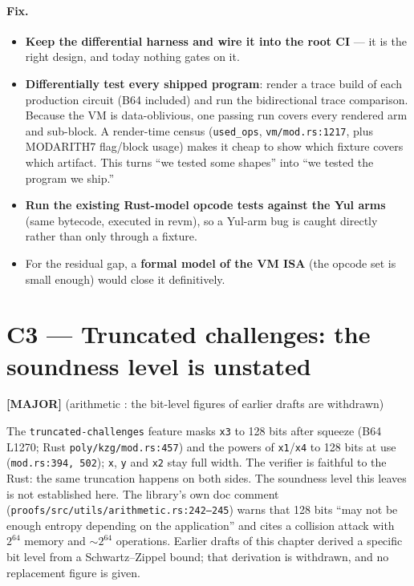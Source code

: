 \paragraph{Fix.}
\begin{itemize}[leftmargin=1.4em,itemsep=2pt]
\item \textbf{Keep the differential harness and wire it into the
  root CI} --- it is the right design, and today nothing gates on it.
\item \textbf{Differentially test every shipped program}: render a
  trace build of each production circuit (B64 included) and run the
  bidirectional trace comparison. Because the VM is data-oblivious,
  one passing run covers every rendered arm and sub-block. A
  render-time census (\texttt{used\_ops}, \texttt{vm/mod.rs:1217},
  plus MODARITH7 flag/block usage) makes it cheap to show which
  fixture covers which artifact. This turns ``we tested some
  shapes'' into ``we tested the program we ship.''
\item \textbf{Run the existing Rust-model opcode tests against the
  Yul arms} (same bytecode, executed in revm), so a Yul-arm bug is
  caught directly rather than only through a fixture.
\item For the residual gap, a \textbf{formal model of the VM
  ISA} (the opcode set is small enough) would close it
  definitively.
\end{itemize}

\section{C3 --- Truncated challenges: the soundness level is unstated}
\label{sec:c3-soundness}
\textcolor{mathpurple}{\textbf{[MAJOR]}} 
(arithmetic : the bit-level figures of earlier drafts are withdrawn)

The \texttt{truncated-challenges} feature masks \texttt{x3} to
128 bits after squeeze (B64 L1270; Rust \texttt{poly/\allowbreak{}kzg/\allowbreak{}mod.rs:457})
and the powers of \texttt{x1}/\texttt{x4} to 128 bits at use
(\texttt{mod.rs:394, 502}); \texttt{x}, \texttt{y} and \texttt{x2}
stay full width. The verifier is faithful to the Rust: the same
truncation happens on both sides. The soundness level this leaves is not established here. The
library's own doc comment (\texttt{proofs/\allowbreak{}src/\allowbreak{}utils/\allowbreak{}arithmetic.rs:242--245})
warns that 128 bits ``may not be enough entropy depending on the
application'' and cites a collision attack with $2^{64}$ memory and
$\sim 2^{64}$ operations. Earlier drafts of this chapter derived a
specific bit level from a Schwartz--Zippel bound; that derivation is
withdrawn, and no replacement figure is given.

